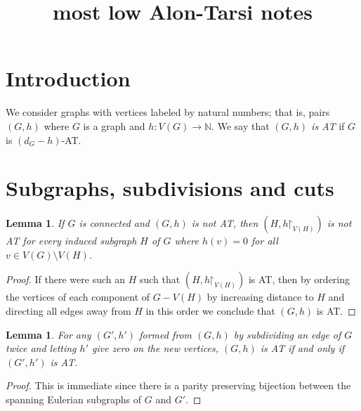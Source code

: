 \documentclass[12pt]{article}
\theoremstyle{plain}
\newtheorem{lem}[thm]{Lemma}
\theoremstyle{definition}
\theoremstyle{remark}
\newcommand{\IN}{\mathbb{N}}
\newcommand{\func}[3]{#1\colon #2 \rightarrow #3}
\newcommand{\parens}[1]{\left( #1 \right)}
\renewcommand{\restriction}{\mathord{\upharpoonright}}
\begin{document}
\title{most low Alon-Tarsi notes}
\author{}
\maketitle

\section{Introduction}

We consider graphs with vertices labeled by natural numbers; that is, pairs $(G,h)$ where $G$ is a graph and $\func{h}{V(G)}{\IN}$.  We say that \emph{$(G, h)$ is AT} if $G$ is $(d_G - h)$-AT.

\section{Subgraphs, subdivisions and cuts}
\begin{lem}\label{InducedSubgraph}
	If $G$ is connected and $(G,h)$ is not AT, then $\parens{H, h\restriction_{V(H)}}$ is not AT for every induced subgraph $H$ of $G$ where $h(v) = 0$ for all $v \in V(G) \setminus V(H)$.
\end{lem}
\begin{proof}
	If there were such an $H$ such that $\parens{H, h\restriction_{V(H)}}$ is AT, then by ordering the vertices of each component of $G - V(H)$ by increasing distance to $H$ and directing all edges away from $H$ in this order we conclude that $(G,h)$ is AT.
\end{proof}

\begin{lem}\label{SubdivideTwice}
	For any $(G',h')$ formed from $(G,h)$ by subdividing an edge of $G$ twice and letting $h'$ give zero on the new vertices, $(G,h)$ is AT if and only if $(G', h')$ is AT.
\end{lem}
\begin{proof}
	This is immediate since there is a parity preserving bijection between the spanning Eulerian subgraphs of $G$ and $G'$. 
\end{proof}
\end{document}
